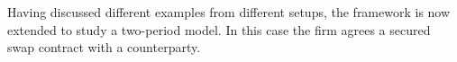 \documentclass[main.tex]{subfiles}
\begin{document}
    Having discussed different examples from different setups, the framework is now extended to study a two-period model. In this case the firm agrees a secured swap contract with a counterparty.
\end{document}
